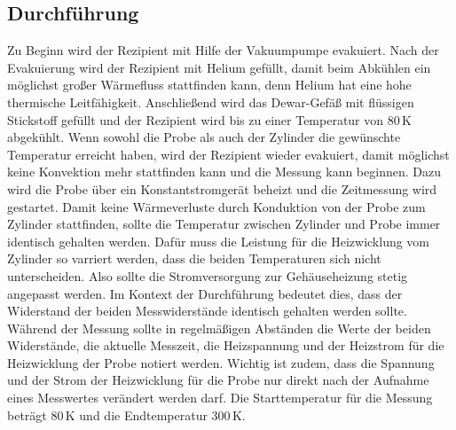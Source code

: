 \subsection{Durchführung}
\label{sec:Durchfuehrung}

Zu Beginn wird der Rezipient mit Hilfe der Vakuumpumpe evakuiert. Nach der Evakuierung wird der Rezipient mit Helium gefüllt, damit beim Abkühlen ein möglichst großer Wärmefluss stattfinden kann, denn Helium hat eine hohe thermische Leitfähigkeit. Anschließend wird das Dewar-Gefäß mit flüssigen Stickstoff gefüllt und der Rezipient wird bis zu einer Temperatur von $80 \, \mathrm{K}$ abgekühlt. Wenn sowohl die Probe als auch der Zylinder die gewünschte Temperatur erreicht haben, wird der Rezipient wieder evakuiert, damit möglichst keine Konvektion mehr stattfinden kann und die Messung kann beginnen. Dazu wird die Probe über ein Konstantstromgerät beheizt und die Zeitmessung wird gestartet. Damit keine Wärmeverluste durch Konduktion von der Probe zum Zylinder stattfinden, sollte die Temperatur zwischen Zylinder und Probe immer identisch gehalten werden. Dafür muss die Leistung für die Heizwicklung vom Zylinder so varriert werden, dass die beiden Temperaturen sich nicht unterscheiden. Also sollte die Stromversorgung zur Gehäuseheizung stetig angepasst werden. Im Kontext der Durchführung bedeutet dies, dass der Widerstand der beiden Messwiderstände identisch gehalten werden sollte. Während der Messung sollte in regelmäßigen Abständen die Werte der beiden Widerstände, die aktuelle Messzeit, die Heizspannung und der Heizstrom für die Heizwicklung der Probe notiert werden. Wichtig ist zudem, dass die Spannung und der Strom der Heizwicklung für die Probe nur direkt nach der Aufnahme eines Messwertes verändert werden darf. Die Starttemperatur für die Messung beträgt $80 \, \mathrm{K}$ und die Endtemperatur $300 \, \mathrm{K}$.